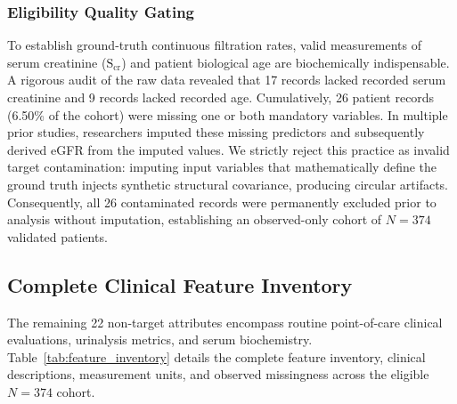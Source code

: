 \documentclass[conference]{IEEEtran}
\begin{document}
\subsubsection{Eligibility Quality Gating}
To establish ground-truth continuous filtration rates, valid measurements of serum creatinine ($\text{S}_{\text{cr}}$) and patient biological age are biochemically indispensable. A rigorous audit of the raw data revealed that 17 records lacked recorded serum creatinine and 9 records lacked recorded age. Cumulatively, 26 patient records (6.50\% of the cohort) were missing one or both mandatory variables. In multiple prior studies, researchers imputed these missing predictors and subsequently derived eGFR from the imputed values. We strictly reject this practice as invalid target contamination: imputing input variables that mathematically define the ground truth injects synthetic structural covariance, producing circular artifacts. Consequently, all 26 contaminated records were permanently excluded prior to analysis without imputation, establishing an observed-only cohort of $N = 374$ validated patients.

\subsection{Complete Clinical Feature Inventory}
The remaining 22 non-target attributes encompass routine point-of-care clinical evaluations, urinalysis metrics, and serum biochemistry. Table~\ref{tab:feature_inventory} details the complete feature inventory, clinical descriptions, measurement units, and observed missingness across the eligible $N = 374$ cohort.
\end{document}
